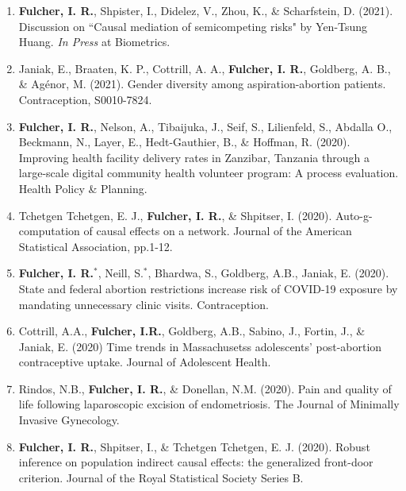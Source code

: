 \documentclass[12pt]{article}
\begin{document}
\begin{enumerate}

\setcounter{enumi}{0}

	\item \textbf{Fulcher, I. R.},  Shpister, I., Didelez, V., Zhou, K., \& Scharfstein, D. (2021). Discussion on ``Causal mediation of semicompeting risks" by Yen-Tsung Huang. \textit{In Press} at Biometrics. 
	
	\item Janiak, E., Braaten, K. P., Cottrill, A. A., \textbf{Fulcher, I. R.}, Goldberg, A. B., \& Agénor, M. (2021). Gender diversity among aspiration-abortion patients. Contraception, S0010-7824.

	\item \textbf{Fulcher, I. R.}, Nelson, A., Tibaijuka, J., Seif, S., Lilienfeld, S., Abdalla O., Beckmann, N., Layer, E., Hedt-Gauthier, B., \& Hoffman, R. (2020). Improving health facility delivery rates in Zanzibar, Tanzania through a large-scale digital community health volunteer program: A process evaluation. Health Policy \& Planning. 
	
	\item Tchetgen Tchetgen, E. J., \textbf{Fulcher, I. R.}, \& Shpitser, I. (2020). Auto-g-computation of causal effects on a network. Journal of the American Statistical Association, pp.1-12.
	
	\item \textbf{Fulcher, I. R.}$^{*}$, Neill, S.$^{*}$, Bhardwa, S., Goldberg, A.B., Janiak, E. (2020). State and federal abortion restrictions increase risk of COVID-19 exposure by mandating unnecessary clinic visits. Contraception. 
	
	\item Cottrill, A.A., \textbf{Fulcher, I.R.}, Goldberg, A.B., Sabino, J., Fortin, J., \& Janiak, E. (2020) Time trends in Massachusetss adolescents' post-abortion contraceptive uptake. Journal of Adolescent Health. 
	
	\item Rindos, N.B., \textbf{Fulcher, I. R.}, \& Donellan, N.M. (2020). Pain and quality of life following laparoscopic excision of endometriosis. The Journal of Minimally Invasive Gynecology. 
	
	\item \textbf{Fulcher, I. R.}, Shpitser, I., \& Tchetgen Tchetgen, E. J. (2020). Robust inference on population indirect causal effects: the generalized front-door criterion. Journal of the Royal Statistical Society Series B. 
	

\end{enumerate}
\end{document}
